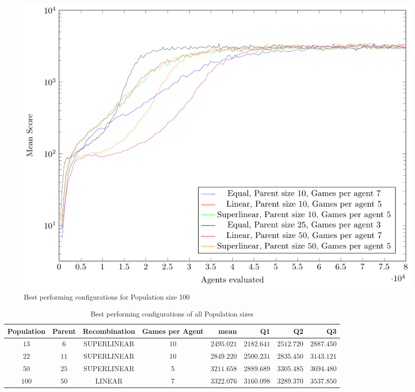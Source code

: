 \begin{figure}[H]
\centering
\includegraphics[scale=1]{data/cma_population_offspring/bestofeach_population/100x/PlotFile.pdf}
\caption{Best performing configurations for Population size 100}
\end{figure}

\clearpage 

\begin{table}[H]
\centering
\small
\begin{tabular}{c c c c r r r r}
Population & Parent & Recombination & Games per Agent & mean & Q1 & Q2 & Q3\\
\hline
$13$ & $6$ & SUPERLINEAR & 10 & $2495.021$ & $2182.641$ & $2512.720$ & $2887.450$\\
$22$ & $11$ & SUPERLINEAR & 10 & $2849.220$ & $2500.231$ & $2835.450$ & $3143.121$\\
$50$ & $25$ & SUPERLINEAR & 5 & $3211.658$ & $2889.689$ & $3305.485$ & $3694.480$\\
$100$ & $50$ & LINEAR & 7 & $3322.076$ & $3160.098$ & $3289.370$ & $3537.850$\\
\end{tabular}
\caption{Best performing configurations of all Population sizes}
\end{table}

